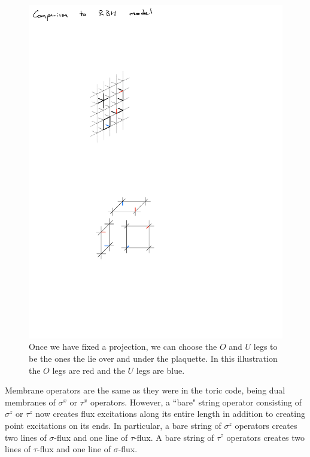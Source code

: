 \documentclass[twocolumn, longbibliography]{revtex4-2}
\begin{document}
\begin{figure}
\centering
\includegraphics[width=\linewidth]{legs}
\caption{Once we have fixed a projection, we can choose the $O$ and $U$ legs to be the ones the lie over and under the plaquette. In this illustration the $O$ legs are red and the $U$ legs are blue.}
\label{fig:legs}
\end{figure}

Membrane operators are the same as they were in the toric code, being dual membranes of $\sigma^x$ or $\tau^x$ operators. However, a ``bare" string operator consisting of $\sigma^z$ or $\tau^z$ now creates flux excitations along its entire length in addition to creating point excitations on its ends. In particular, a bare string of $\sigma^z$ operators creates two lines of $\sigma$-flux and one line of $\tau$-flux. A bare string of $\tau^z$ operators creates two lines of $\tau$-flux and one line of $\sigma$-flux.
\end{document}
